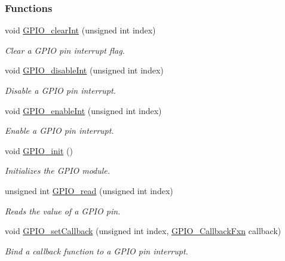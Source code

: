 \subsubsection*{Functions}
\begin{DoxyCompactItemize}
\item 
void \hyperlink{_g_p_i_o_8h_ad890aa2518ec2f4c88419dc4036b6197}{G\+P\+I\+O\+\_\+clear\+Int} (unsigned int index)
\begin{DoxyCompactList}\small\item\em Clear a G\+P\+I\+O pin interrupt flag. \end{DoxyCompactList}\item 
void \hyperlink{_g_p_i_o_8h_a37f548f4dabd9ee12e3ba4805ce1680e}{G\+P\+I\+O\+\_\+disable\+Int} (unsigned int index)
\begin{DoxyCompactList}\small\item\em Disable a G\+P\+I\+O pin interrupt. \end{DoxyCompactList}\item 
void \hyperlink{_g_p_i_o_8h_a3192dd50a71f491f45bb8c5d4ba384dc}{G\+P\+I\+O\+\_\+enable\+Int} (unsigned int index)
\begin{DoxyCompactList}\small\item\em Enable a G\+P\+I\+O pin interrupt. \end{DoxyCompactList}\item 
void \hyperlink{_g_p_i_o_8h_a7aaec489dca5ac4d278d2eb3ae38a2d2}{G\+P\+I\+O\+\_\+init} ()
\begin{DoxyCompactList}\small\item\em Initializes the G\+P\+I\+O module. \end{DoxyCompactList}\item 
unsigned int \hyperlink{_g_p_i_o_8h_a200db4ea3141abfc9c9a6ca202c2e2e4}{G\+P\+I\+O\+\_\+read} (unsigned int index)
\begin{DoxyCompactList}\small\item\em Reads the value of a G\+P\+I\+O pin. \end{DoxyCompactList}\item 
void \hyperlink{_g_p_i_o_8h_adde3a4e1f73a9c9971f91e17d75a2e86}{G\+P\+I\+O\+\_\+set\+Callback} (unsigned int index, \hyperlink{_g_p_i_o_8h_a033bc79f1a530381da2b74711e6b8971}{G\+P\+I\+O\+\_\+\+Callback\+Fxn} callback)
\begin{DoxyCompactList}\small\item\em Bind a callback function to a G\+P\+I\+O pin interrupt. \end{DoxyCompactList}\item 

\end{DoxyCompactItemize}
